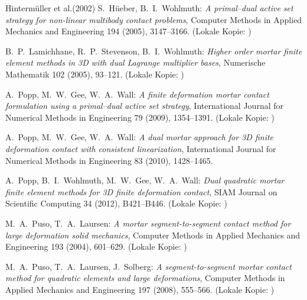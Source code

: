 \documentclass[a4paper,11pt]{article}
\begin{document}
\begin{thebibliography}{Hintermüller et al.(2002)}
 S.~H\"ueber, B.~I.~Wohlmuth: \emph{A primal--dual active set strategy for non-linear multibody contact problems}, Computer Methods in Applied Mechanics and Engineering 194 (2005), 3147--3166. (Lokale Kopie: )

 B.~P.~Lamichhane, R.~P.~Stevenson, B.~I.~Wohlmuth: \emph{Higher order mortar finite element methods in 3D with dual Lagrange multiplier bases}, Numerische Mathematik 102 (2005), 93--121. (Lokale Kopie: )

 A.~Popp, M.~W.~Gee, W.~A.~Wall: \emph{A finite deformation mortar contact formulation using a primal--dual active set strategy}, International Journal for Numerical Methods in Engineering 79 (2009), 1354--1391. (Lokale Kopie: )

 A.~Popp, M.~W.~Gee, W.~A.~Wall: \emph{A dual mortar approach for 3D finite deformation contact with consistent linearization}, International Journal for Numerical Methods in Engineering 83 (2010), 1428--1465.

 A.~Popp, B.~I.~Wohlmuth, M.~W.~Gee, W.~A.~Wall: \emph{Dual quadratic mortar finite element methods for 3D finite deformation contact}, SIAM Journal on Scientific Computing 34 (2012), B421--B446. (Lokale Kopie: )

 M.~A.~Puso, T.~A.~Laursen: \emph{A mortar segment-to-segment contact method for large deformation solid mechanics}, Computer Methods in Applied Mechanics and Engineering 193 (2004), 601--629. (Lokale Kopie: )

 M.~A.~Puso, T.~A.~Laursen, J.~Solberg: \emph{A segment-to-segment mortar contact method for quadratic elements and large deformations}, Computer Methods in Applied Mechanics and Engineering 197 (2008), 555--566. (Lokale Kopie: )


\end{thebibliography}
\end{document}
